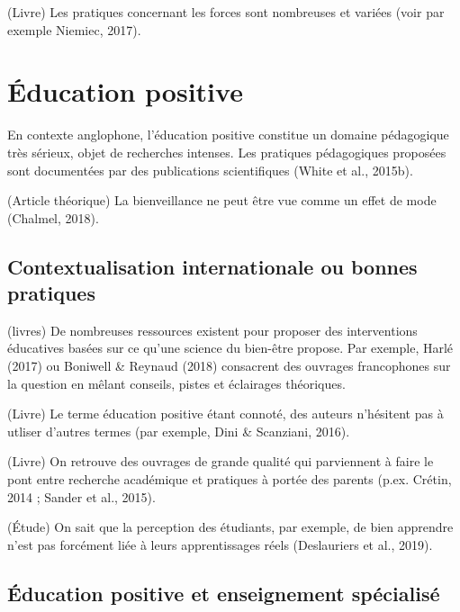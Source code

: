 \documentclass[
  french,
]{article}
\begin{document}
(Livre) Les pratiques concernant les forces sont nombreuses et variées (voir par exemple Niemiec, 2017).

\hypertarget{uxe9ducation-positive}{%
\section{Éducation positive}\label{uxe9ducation-positive}}

En contexte anglophone, l'éducation positive constitue un domaine pédagogique très sérieux, objet de recherches intenses. Les pratiques pédagogiques proposées sont documentées par des publications scientifiques (White et al., 2015b).

(Article théorique) La bienveillance ne peut être vue comme un effet de mode (Chalmel, 2018).

\hypertarget{contextualisation-internationale-ou-bonnes-pratiques}{%
\subsection{Contextualisation internationale ou bonnes pratiques}\label{contextualisation-internationale-ou-bonnes-pratiques}}

(livres) De nombreuses ressources existent pour proposer des interventions éducatives basées sur ce qu'une science du bien-être propose. Par exemple, Harlé (2017) ou Boniwell \& Reynaud (2018) consacrent des ouvrages francophones sur la question en mêlant conseils, pistes et éclairages théoriques.

(Livre) Le terme éducation positive étant connoté, des auteurs n'hésitent pas à utliser d'autres termes (par exemple, Dini \& Scanziani, 2016).

(Livre) On retrouve des ouvrages de grande qualité qui parviennent à faire le pont entre recherche académique et pratiques à portée des parents (p.ex. Crétin, 2014 ; Sander et al., 2015).

(Étude) On sait que la perception des étudiants, par exemple, de bien apprendre n'est pas forcément liée à leurs apprentissages réels (Deslauriers et al., 2019).

\hypertarget{uxe9ducation-positive-et-enseignement-spuxe9cialisuxe9}{%
\subsection{Éducation positive et enseignement spécialisé}\label{uxe9ducation-positive-et-enseignement-spuxe9cialisuxe9}}
\end{document}
